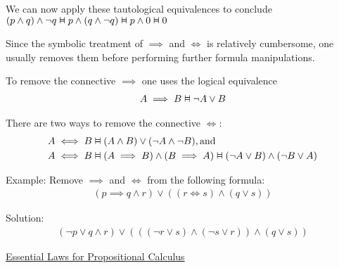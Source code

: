 \documentclass{article}
\newcommand{\vDashv}{%
  \mathrel{%
    \text{%
      \ooalign{$\vDash$\cr\reflectbox{$\vDash$}\cr}%
    }%
  }%
}
\begin{document}
We can now apply these tautological equivalences to conclude $(p \wedge q) \wedge \neg q \vDashv p \wedge (q \wedge \neg q) \vDashv p \wedge 0 \vDashv 0$

Since the symbolic treatment of $\implies$ and $\iff$ is relatively cumbersome, one usually removes them before performing further formula manipulations. 

To remove the connective $\implies$ one uses the logical equivalence
\begin{align*}
A \implies B \vDashv \neg A \vee B
\end{align*}

There are two ways to remove the connective $\iff$:
\begin{align*}
&A \iff B \vDashv (A \wedge B) \vee (\neg A \wedge \neg B), \text{and} \\
&A \iff B \vDashv (A \implies B) \wedge (B \implies A) \vDashv (\neg A \vee B) \wedge (\neg B \vee A)
\end{align*}

Example: Remove $\implies$ and $\iff$ from the following formula:
\begin{align*}
(p \implies q \wedge r) \vee ((r \iff s) \wedge (q \vee s))
\end{align*}

Solution:
\begin{align*}
(\neg p \vee q \wedge r) \vee ((( \neg r \vee s) \wedge (\neg s \vee r)) \wedge (q \vee s))
\end{align*}

\underline{Essential Laws for Propositional Calculus}
\end{document}
